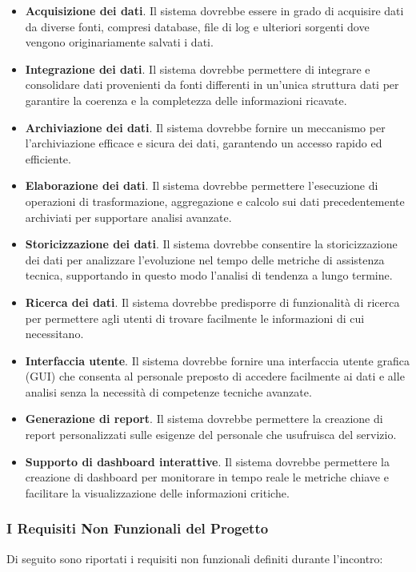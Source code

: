 \begin{itemize}
    \item \textbf{Acquisizione dei dati}. Il sistema dovrebbe essere in grado di acquisire dati da diverse fonti, compresi database, file di log e ulteriori sorgenti dove vengono originariamente salvati i dati.
    \item \textbf{Integrazione dei dati}. Il sistema dovrebbe permettere di integrare e consolidare dati provenienti da fonti differenti in un'unica struttura dati per garantire la coerenza e la completezza delle informazioni ricavate.
    \item \textbf{Archiviazione dei dati}. Il sistema dovrebbe fornire un meccanismo per l'archiviazione efficace e sicura dei dati, garantendo un accesso rapido ed efficiente.
    \item \textbf{Elaborazione dei dati}. Il sistema dovrebbe permettere l'esecuzione di operazioni di trasformazione, aggregazione e calcolo sui dati precedentemente archiviati per supportare analisi avanzate.
    \item \textbf{Storicizzazione dei dati}. Il sistema dovrebbe consentire la storicizzazione dei dati per analizzare l'evoluzione nel tempo delle metriche di assistenza tecnica, supportando in questo modo l'analisi di tendenza a lungo termine.
    \item \textbf{Ricerca dei dati}. Il sistema dovrebbe predisporre di funzionalità di ricerca per permettere agli utenti di trovare facilmente le informazioni di cui necessitano.
    \item \textbf{Interfaccia utente}. Il sistema dovrebbe fornire una interfaccia utente grafica (GUI) che consenta al personale preposto di accedere facilmente ai dati e alle analisi senza la necessità di competenze tecniche avanzate.
    \item \textbf{Generazione di report}. Il sistema dovrebbe permettere la creazione di report personalizzati sulle esigenze del personale che usufruisca del servizio.
    \item \textbf{Supporto di dashboard interattive}. Il sistema dovrebbe permettere la creazione di dashboard per monitorare in tempo reale le metriche chiave e facilitare la visualizzazione delle informazioni critiche.
\end{itemize}

\subsubsection{I Requisiti Non Funzionali del Progetto}
Di seguito sono riportati i requisiti non funzionali definiti durante l'incontro:

